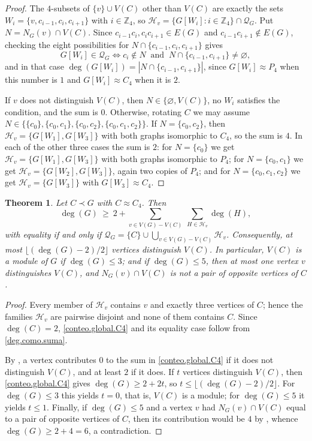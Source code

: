\documentclass[11pt]{article}
\newtheorem{theorem}{Theorem}[section]
\begin{document}
\begin{proof}
	The $4$-subsets of $\{v\}\cup V(C)$ other than $V(C)$ are exactly the
	sets $W_i=\{v,c_{i-1},c_i,c_{i+1}\}$ with $i\in\mathbb{Z}_4$, so
	$\mathcal{H}_v=\{G[W_i]:i\in\mathbb{Z}_4\}\cap \mathcal{Q}_G$. Put
		$N=N_G(v)\cap V(C)$. Since $c_{i-1}c_i,c_ic_{i+1}\in E(G)$ and
	$c_{i-1}c_{i+1}\notin E(G)$, checking the eight possibilities for
	$N\cap\{c_{i-1},c_i,c_{i+1}\}$ gives
	\[
	G[W_i]\in \mathcal{Q}_G\iff c_i\notin N\ \text{ and }\
	N\cap\{c_{i-1},c_{i+1}\}\neq\varnothing,
	\]
	and in that case $\deg(G[W_i])=|N\cap\{c_{i-1},c_{i+1}\}|$, since
	$G[W_i]\approx P_4$ when this number is $1$ and $G[W_i]\approx C_4$
	when it is $2$.
	
	If $v$ does not distinguish $V(C)$, then $N\in\{\varnothing,V(C)\}$,
	no $W_i$ satisfies the condition, and the sum is $0$. Otherwise,
	rotating $C$ we may assume $N\in\{\{c_0\},\{c_0,c_1\},\{c_0,c_2\},
	\{c_0,c_1,c_2\}\}$. If $N=\{c_0,c_2\}$, then
	$\mathcal{H}_v=\{G[W_1],G[W_3]\}$ with both graphs isomorphic to
	$C_4$, so the sum is $4$. In each of the other three cases the sum is
	$2$: for $N=\{c_0\}$ we get $\mathcal{H}_v=\{G[W_1],G[W_3]\}$ with both
	graphs isomorphic to $P_4$; for $N=\{c_0,c_1\}$ we get
	$\mathcal{H}_v=\{G[W_2],G[W_3]\}$, again two copies of $P_4$; and for
	$N=\{c_0,c_1,c_2\}$ we get $\mathcal{H}_v=\{G[W_3]\}$ with
	$G[W_3]\approx C_4$.
\end{proof}

\begin{theorem}
	\label{C4.distinguidores}
	Let $C\prec G$ with $C\approx C_4$. Then
	\begin{equation}
		\label{conteo.global.C4}
		\deg(G)\ \geq\ 2+\sum_{v\in V(G)-V(C)}\ \sum_{H\in\mathcal{H}_v}\deg(H),
	\end{equation}
	with equality if and only if
	$\mathcal{Q}_G=\{C\}\cup\bigcup_{v\in V(G)-V(C)}\mathcal{H}_v$. Consequently,
	at most $\lfloor(\deg(G)-2)/2\rfloor$ vertices distinguish $V(C)$. In
	particular, $V(C)$ is a module of $G$ if $\deg(G)\leq 3$; and if
	$\deg(G)\leq 5$, then at most one vertex $v$ distinguishes $V(C)$,
	and $N_G(v)\cap V(C)$ is not a pair of opposite vertices of $C$.
\end{theorem}

\begin{proof}
	Every member of $\mathcal{H}_v$ contains $v$ and exactly three
	vertices of $C$; hence the families $\mathcal{H}_v$ are pairwise
	disjoint and none of them contains $C$. Since $\deg(C)=2$,
	\eqref{conteo.global.C4} and its equality case follow from
	\eqref{deg.como.suma}.
	
	By , a vertex contributes $0$ to the sum in
	\eqref{conteo.global.C4} if it does not distinguish $V(C)$, and at
	least $2$ if it does. If $t$ vertices distinguish $V(C)$, then
	\eqref{conteo.global.C4} gives $\deg(G)\geq 2+2t$, so
	$t\leq\lfloor(\deg(G)-2)/2\rfloor$. For $\deg(G)\leq 3$ this yields
	$t=0$, that is, $V(C)$ is a module; for $\deg(G)\leq 5$ it yields
	$t\leq 1$. Finally, if $\deg(G)\leq 5$ and a vertex $v$ had
	$N_G(v)\cap V(C)$ equal to a pair of opposite vertices of $C$, then
	its contribution would be $4$ by \Cref{conteo.local.C4}, whence
	$\deg(G)\geq 2+4=6$, a contradiction.
\end{proof}
\end{document}
